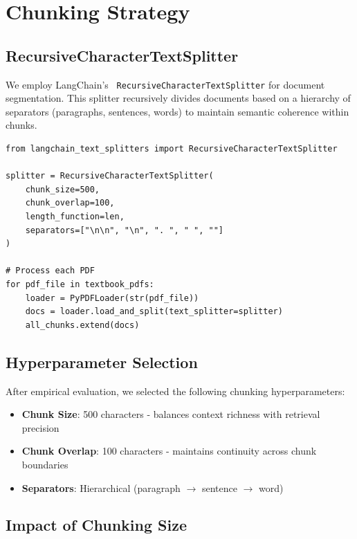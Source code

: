 \documentclass[11pt,a4paper]{article}
\begin{document}
\section{Chunking Strategy}

\subsection{RecursiveCharacterTextSplitter}

We employ LangChain's~\cite{langchain2023} \texttt{RecursiveCharacterTextSplitter} for document segmentation. This splitter recursively divides documents based on a hierarchy of separators (paragraphs, sentences, words) to maintain semantic coherence within chunks.

\begin{lstlisting}[caption=Chunking Implementation]
from langchain_text_splitters import RecursiveCharacterTextSplitter

splitter = RecursiveCharacterTextSplitter(
    chunk_size=500,
    chunk_overlap=100,
    length_function=len,
    separators=["\n\n", "\n", ". ", " ", ""]
)

# Process each PDF
for pdf_file in textbook_pdfs:
    loader = PyPDFLoader(str(pdf_file))
    docs = loader.load_and_split(text_splitter=splitter)
    all_chunks.extend(docs)
\end{lstlisting}

\subsection{Hyperparameter Selection}

After empirical evaluation, we selected the following chunking hyperparameters:

\begin{itemize}
    \item \textbf{Chunk Size}: 500 characters - balances context richness with retrieval precision
    \item \textbf{Chunk Overlap}: 100 characters - maintains continuity across chunk boundaries
    \item \textbf{Separators}: Hierarchical (paragraph $\rightarrow$ sentence $\rightarrow$ word)
\end{itemize}

\subsection{Impact of Chunking Size}
\end{document}
